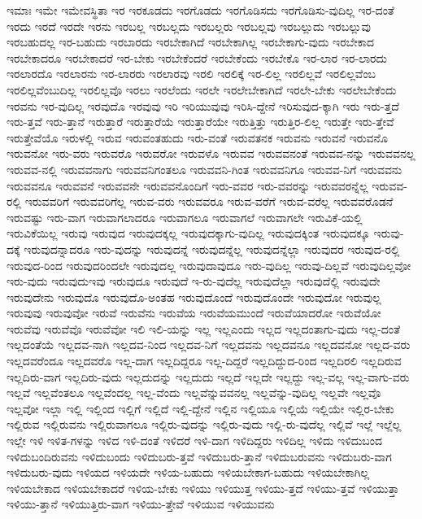 {ಇಮಾಃ
ಇಮೇ
ಇಮೇವಸ್ಥಿತಾ
ಇರ
ಇರಕೂಡದು
ಇರಗೊಡದು
ಇರಗೊಡಿಸದು
ಇರಗೊಡಿಸು-ವುದಿಲ್ಲ
ಇರ-ದಂತೆ
ಇರದು
ಇರದೆ
ಇರದೇ
ಇರನು
ಇರಬಲ್ಲ
ಇರಬಲ್ಲದು
ಇರಬಲ್ಲರು
ಇರಬಲ್ಲವು
ಇರಬಲ್ಲುದು
ಇರಬಲ್ಲುವು
ಇರಬಹುದಲ್ಲ
ಇರ-ಬಹುದು
ಇರಬಾರದು
ಇರಬೇಕಾಗಿದೆ
ಇರಬೇಕಾಗಿಲ್ಲ
ಇರಬೇಕಾಗು-ವುದು
ಇರಬೇಕಾದ
ಇರಬೇಕಾದರೂ
ಇರಬೇಕಾದರೆ
ಇರ-ಬೇಕು
ಇರಬೇಕೆಂದರೆ
ಇರಬೇಕೆಂದು
ಇರಬೇಕೊ
ಇರ-ಲಾರ
ಇರ-ಲಾರದು
ಇರಲಾರದೊ
ಇರಲಾರನು
ಇರ-ಲಾರರು
ಇರಲಾರವು
ಇರಲಿ
ಇರಲಿಕ್ಕೆ
ಇರ-ಲಿಲ್ಲ
ಇರಲಿಲ್ಲವೆ
ಇರಲಿಲ್ಲವೆಂಬ
ಇರಲಿಲ್ಲವೆಂಬುದಿಲ್ಲ
ಇರಲಿಲ್ಲವೊ
ಇರಲು
ಇರಲೆಂದು
ಇರಲೇ
ಇರಲೇಬೇಕಾಗಿದೆ
ಇರಲೇ-ಬೇಕು
ಇರಲೇಬೇಕೆಂದು
ಇರವನು
ಇರ-ವುದಿಲ್ಲ
ಇರವುದೊ
ಇರವುವು
ಇರಿ
ಇರಿಯುವುವು
ಇರಿಸಿ-ದ್ದೇನೆ
ಇರಿಸುವುದ-ಕ್ಕಾಗಿ
ಇರು
ಇರು-ತ್ತದೆ
ಇರು-ತ್ತವೆ
ಇರು-ತ್ತಾನೆ
ಇರುತ್ತಾರೆ
ಇರುತ್ತಾರೆಯೆ
ಇರುತ್ತಾರೆಯೇ
ಇರುತ್ತಿತ್ತು
ಇರುತ್ತಿರ-ಲಿಲ್ಲ
ಇರುತ್ತೇ
ಇರು-ತ್ತೇವೆ
ಇರುತ್ತೇವೆಯೊ
ಇರುಳಲ್ಲಿ
ಇರುವ
ಇರುವಂತಹುದು
ಇರು-ವಂತೆ
ಇರುವತನಕ
ಇರುವನು
ಇರುವನೆ
ಇರುವನೊ
ಇರುವನೋ
ಇರು-ವರು
ಇರುವರೊ
ಇರುವರೋ
ಇರುವಳೊ
ಇರುವವ
ಇರುವವನಂತೆ
ಇರುವವ-ನನ್ನು
ಇರುವವನಲ್ಲ
ಇರುವವ-ನಲ್ಲಿ
ಇರುವವನಾಗು
ಇರುವವನಿಗಂತಲೂ
ಇರುವವನಿ-ಗಿಂತ
ಇರುವವನಿಗೂ
ಇರುವವ-ನಿಗೆ
ಇರುವವನು
ಇರುವವನೂ
ಇರುವವನೆ
ಇರುವವನೇ
ಇರುವವನೊಂದಿಗೆ
ಇರು-ವವರ
ಇರು-ವವರನ್ನು
ಇರುವವರನ್ನೆಲ್ಲ
ಇರುವವ-ರಲ್ಲಿ
ಇರುವವರಿಗೆ
ಇರುವವರಿಗೆಲ್ಲ
ಇರುವ-ವರು
ಇರುವವರೂ
ಇರುವ-ವರೆಗೆ
ಇರುವ-ವರೆಲ್ಲ
ಇರುವವರೊಡನೆ
ಇರುವಷ್ಟು
ಇರು-ವಾಗ
ಇರುವಾಗಲಾದರೂ
ಇರುವಾಗಲೂ
ಇರುವಾಗಲೆ
ಇರುವಾಗಲೇ
ಇರುವಿಕೆ-ಯಲ್ಲಿ
ಇರುವಿಕೆಯಿಲ್ಲ
ಇರುವು
ಇರುವುದ
ಇರುವುದಕ್ಕಲ್ಲ
ಇರುವುದಕ್ಕಾಗು-ವುದಿಲ್ಲ
ಇರುವುದಕ್ಕಿಂತ
ಇರುವುದಕ್ಕೂ
ಇರುವು-ದಕ್ಕೆ
ಇರುವುದನ್ನಾದರೂ
ಇರು-ವುದನ್ನು
ಇರುವುದನ್ನೆ
ಇರುವುದನ್ನೆಲ್ಲ
ಇರುವುದನ್ನೆಲ್ಲಾ
ಇರುವುದರ
ಇರುವುದ-ರಲ್ಲಿ
ಇರುವುದ-ರಿಂದ
ಇರುವುದರಿಂದಲೇ
ಇರುವುದಲ್ಲ
ಇರುವುದಾವುದೂ
ಇರು-ವುದಿಲ್ಲ
ಇರುವು-ದಿಲ್ಲವೆ
ಇರುವುದಿಲ್ಲವೋ
ಇರು-ವುದು
ಇರುವುದುಇವು
ಇರುವುದೂ
ಇರುವುದೆ
ಇ-ರು-ವುದೆಲ್ಲ
ಇರುವುದೆಲ್ಲಾ
ಇರುವುದೆಲ್ಲಿ
ಇರುವುದೇ
ಇರುವುದೇನು
ಇರುವುದೊ
ಇರುವುದೊ-ಅಂತಹ
ಇರುವುದೊಂದೆ
ಇರುವುದೊಂದೇ
ಇರುವುದೋ
ಇರುವುಲ್ಲ
ಇರುವುವು
ಇರುವುವೋ
ಇರುವೆ
ಇರುವೆನು
ಇರುವೆಯ
ಇರುವೆಯಮುಂದೆ
ಇರುವೆಯಾದರೋ
ಇರುವೆಯೋ
ಇರುವೆವು
ಇರುವೆವೊ
ಇರುವೆವೋ
ಇಲಿ
ಇಲಿ-ಯನ್ನು
ಇಲ್ಲ
ಇಲ್ಲಎಂದು
ಇಲ್ಲದ
ಇಲ್ಲದಂತಾಗು-ವುದು
ಇಲ್ಲ-ದಂತೆ
ಇಲ್ಲದಂತೆಯೆ
ಇಲ್ಲದವ-ನಾಗಿ
ಇಲ್ಲದವ-ನಿಂದ
ಇಲ್ಲದವ-ನಿಗೆ
ಇಲ್ಲದವನು
ಇಲ್ಲದವನೂ
ಇಲ್ಲದವನೋ
ಇಲ್ಲದ-ವರು
ಇಲ್ಲದವರೆಂದೂ
ಇಲ್ಲದವರೊ
ಇಲ್ಲ-ದಾಗ
ಇಲ್ಲದಿದ್ದರೂ
ಇಲ್ಲ-ದಿದ್ದರೆ
ಇಲ್ಲದಿದ್ದುದ-ರಿಂದ
ಇಲ್ಲದಿರಲಿ
ಇಲ್ಲದಿರುವ
ಇಲ್ಲದಿರು-ವಾಗ
ಇಲ್ಲದಿರು-ವುದು
ಇಲ್ಲದುದನ್ನು
ಇಲ್ಲದುದು
ಇಲ್ಲದೆ
ಇಲ್ಲದೇ
ಇಲ್ಲದ್ದು
ಇಲ್ಲ-ವಲ್ಲ
ಇಲ್ಲ-ವಾಗು-ವರು
ಇಲ್ಲವೆ
ಇಲ್ಲವೆಂತಲೂ
ಇಲ್ಲವೆಂದಲ್ಲ
ಇಲ್ಲ-ವೆಂದು
ಇಲ್ಲವೆನ್ನುವವನಲ್ಲ
ಇಲ್ಲವೆನ್ನು-ವುದಿಲ್ಲ
ಇಲ್ಲವೇ
ಇಲ್ಲವೊ
ಇಲ್ಲವೋ
ಇಲ್ಲಾ
ಇಲ್ಲಿ
ಇಲ್ಲಿಂದ
ಇಲ್ಲಿಗೆ
ಇಲ್ಲಿದೆ
ಇಲ್ಲಿ-ದ್ದೇನೆ
ಇಲ್ಲಿನ
ಇಲ್ಲಿಯೂ
ಇಲ್ಲಿಯೆ
ಇಲ್ಲಿಯೇ
ಇಲ್ಲಿರ-ಬೇಕು
ಇಲ್ಲಿರುವ
ಇಲ್ಲಿರುವನು
ಇಲ್ಲಿರುವಾಗಲೂ
ಇಲ್ಲಿರು-ವುದನ್ನು
ಇಲ್ಲಿರು-ವುದು
ಇಲ್ಲಿ-ರು-ವುದೆಲ್ಲ
ಇಲ್ಲಿವೆ
ಇಲ್ಲೆ
ಇಲ್ಲೆಲ್ಲ
ಇಲ್ಲೇ
ಇಳಿ
ಇಳಿತ-ಗಳನ್ನು
ಇಳಿದ
ಇಳಿ-ದಂತೆ
ಇಳಿದರೆ
ಇಳಿ-ದಾಗ
ಇಳಿದಿದ್ದರು
ಇಳಿದಿಲ್ಲ
ಇಳಿದು
ಇಳಿದುಬಂದ
ಇಳಿದುಬಂದಿರುವನು
ಇಳಿದುಬಂದು
ಇಳಿದುಬರು-ತ್ತವೆ
ಇಳಿದುಬರು-ತ್ತಾನೆ
ಇಳಿದುಬರುವನು
ಇಳಿದುಬರು-ವಾಗ
ಇಳಿದುಬರು-ವುದು
ಇಳಿಯದ
ಇಳಿಯದೇ
ಇಳಿಯ-ಬಹುದು
ಇಳಿಯಬೇಕಾಗ-ಬಹುದು
ಇಳಿಯಬೇಕಾಗಿಲ್ಲ
ಇಳಿಯಬೇಕಾದ
ಇಳಿಯಬೇಕಾದರೆ
ಇಳಿಯ-ಬೇಕು
ಇಳಿಯು
ಇಳಿಯುತ್ತ
ಇಳಿಯು-ತ್ತದೆ
ಇಳಿಯು-ತ್ತವೆ
ಇಳಿಯುತ್ತಾ
ಇಳಿಯು-ತ್ತಾನೆ
ಇಳಿಯುತ್ತಿರು-ವಾಗ
ಇಳಿಯು-ತ್ತೇವೆ
ಇಳಿಯುವ
ಇಳಿಯುವನು
}
